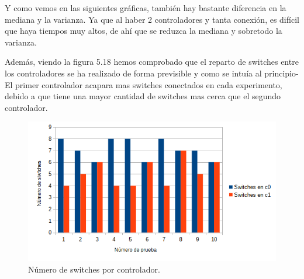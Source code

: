 \documentclass[a4paper, 12pt]{book}
\begin{document}
 	Y como vemos en las siguientes gráficas, también hay bastante diferencia en la mediana y la varianza. Ya que al haber 2 controladores y tanta conexión, es difícil que haya tiempos muy altos, de ahí que se reduzca la mediana y sobretodo la varianza.
 	
 	\begin{figure}[H]
 		\centering
 		
 		\hfill
 		\hfill
 	\end{figure}
 	
 	
 	\clearpage
 	Además, viendo la figura 5.18 hemos comprobado que el reparto de switches entre los controladores se ha realizado de forma previsible y como se intuía al principio- El primer controlador acapara mas switches conectados en cada experimento, debido a que tiene una mayor cantidad de switches mas cerca que el segundo controlador.
 	
 	
 	\begin{figure}[H]
 		\centering
 		\includegraphics[width=16cm, keepaspectratio]{img/switchesporcontrollerescenario3}
 		\caption{Número de switches por controlador.}
 		\label{figura:switchesporcontrollerb4}
 	\end{figure}
	
\end{document}
